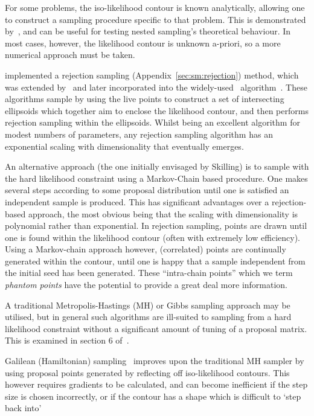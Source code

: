 For some problems, the iso-likelihood contour is known analytically, allowing one to construct a sampling procedure specific to that problem. This is demonstrated by~\cite{Keeton}, and can be useful for testing nested sampling's theoretical behaviour. In most cases, however, the likelihood contour is unknown a-priori, so a more numerical approach must be taken.

\cite{Mukherjee} implemented a rejection sampling (Appendix~\ref{sec:sm:rejection}) method, which was extended by~\cite{Shaw_et_al} and later incorporated into the widely-used~\MultiNest{} algorithm~\citep{MultiNest1,MultiNest2,MultiNest3}.
These algorithms sample by using the live points to construct a set of intersecting ellipsoids which together aim to enclose the likelihood contour, and then performs rejection sampling within the ellipsoids.
 Whilst being an excellent algorithm for modest numbers of parameters, any rejection sampling algorithm has an exponential scaling with dimensionality that eventually emerges.

An alternative approach (the one initially envisaged by Skilling) is to sample with the hard likelihood constraint using a Markov-Chain based procedure. One makes several steps according to some proposal distribution until one is satisfied an independent sample is produced. This has significant advantages over a rejection-based approach, the most obvious being that the scaling with dimensionality is polynomial rather than exponential. In rejection sampling, points are drawn until one is found within the likelihood contour (often with extremely low efficiency). Using a Markov-chain approach however, (correlated) points are continually generated within the contour, until one is happy that a sample independent from the initial seed has been generated. These ``intra-chain points'' which we term {\em phantom points\/} have the potential to provide a great deal more information.

A traditional Metropolis-Hastings (MH) or Gibbs sampling approach may be utilised, but in general such algorithms are ill-suited to sampling from a hard likelihood constraint without a significant amount of tuning of a proposal matrix. This is examined in section 6 of~\cite{MultiNest1}.

Galilean (Hamiltonian) sampling~\citep{GalileanNestedSampling,Betancourt2011} improves upon the traditional MH sampler by using proposal points generated by reflecting off iso-likelihood contours. This however requires gradients to be calculated, and can become inefficient if the step size is chosen incorrectly, or if the contour has a shape which is difficult to `step back into'

